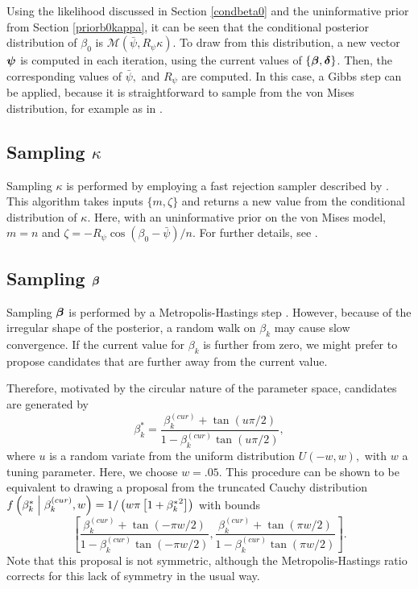 Using the likelihood discussed in Section \ref{condbeta0} and the uninformative prior from Section \ref{priorb0kappa}, it can be seen that the conditional posterior distribution of \( \beta_0 \) is \( \mathcal{M}(\bar\psi, R_{\psi} \kappa).\)
To draw from this distribution, a new vector \( \boldsymbol{\psi} \)  is computed in each iteration, using the current values of \( \{ \boldsymbol{\beta}, \boldsymbol{\delta} \} \). Then, the corresponding values of \( \bar\psi, \) and \( R_{\psi} \) are computed. In this case, a Gibbs step can be applied, because it is straightforward to sample from the von Mises distribution, for example as in \citet{best1979efficient}.

\subsection{Sampling $\kappa$}

Sampling \( \kappa \) is performed by employing a fast rejection sampler described by \citet{forbes2015fast}. This algorithm takes inputs \( \{ m, \zeta \} \) and returns a new value from the conditional distribution of \( \kappa \). Here, with an uninformative prior on the von Mises model, \( m = n \) and  \( \zeta = - R_\psi \cos(\beta_0 - \bar\psi) /n.\) For further details, see \citet{forbes2015fast}.


\subsection{Sampling $\boldsymbol{\beta}$}

Sampling \( \boldsymbol{\beta} \) is performed by a Metropolis-Hastings step \citep{metropolis1953equation, hastings1970monte}. However, because of the irregular shape of the posterior, a random walk on \( \beta_k \) may cause slow convergence. If the current value for \( \beta_k \) is further from zero, we might prefer to propose candidates that are further away from the current value.

Therefore, motivated by the circular nature of the parameter space, candidates are generated by
\begin{equation}
\beta_k^{*} = \frac{\beta_k^{(cur)} + \tan(u \pi / 2)}{1 - \beta_k^{(cur)} \tan(u \pi / 2)},
\end{equation}
where \( u \) is a random variate from the uniform distribution \( U(-w, w),\) with \( w \) a tuning parameter. Here, we choose \( w = .05. \) This procedure can be shown to be equivalent to drawing a proposal from the truncated Cauchy distribution \( f \left( \beta_k^{*} \mathrel{}\middle|\mathrel{} \beta_k^{(cur)}, w \right) = 1 / \left( w \pi \left[ 1 + {\beta_k^{*}}^2 \right] \right) \) with bounds
\begin{equation*}
\left[ \frac{ \beta_k^{(cur)} + \tan(- \pi w / 2)}{1 - \beta_k^{(cur)} \tan(- \pi w / 2)}, \frac{ \beta_k^{(cur)} + \tan(\pi w / 2)}{1 - \beta_k^{(cur)} \tan(\pi w / 2)} \right].
\end{equation*}
Note that this proposal is not symmetric, although the Metropolis-Hastings ratio corrects for this lack of symmetry in the usual way.


